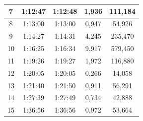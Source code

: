 \begin{table}[]
\begin{tabular}{|c|c|c|c|c|}
{\color[HTML]{000000} 7}                              & {\color[HTML]{000000} 1:12:47}                          & {\color[HTML]{000000} 1:12:48}                           & {\color[HTML]{000000} 1,936}            & {\color[HTML]{000000} 111,184}        \\ \hline
{\color[HTML]{000000} 8}                              & {\color[HTML]{000000} 1:13:00}                          & {\color[HTML]{000000} 1:13:00}                           & {\color[HTML]{000000} 0,947}            & {\color[HTML]{000000} 54,926}         \\ \hline
{\color[HTML]{000000} 9}                              & {\color[HTML]{000000} 1:14:27}                          & {\color[HTML]{000000} 1:14:31}                           & {\color[HTML]{000000} 4,245}            & {\color[HTML]{000000} 235,470}        \\ \hline
{\color[HTML]{000000} 10}                             & {\color[HTML]{000000} 1:16:25}                          & {\color[HTML]{000000} 1:16:34}                           & {\color[HTML]{000000} 9,917}            & {\color[HTML]{000000} 579,450}        \\ \hline
{\color[HTML]{000000} 11}                             & {\color[HTML]{000000} 1:19:26}                          & {\color[HTML]{000000} 1:19:27}                           & {\color[HTML]{000000} 1,972}            & {\color[HTML]{000000} 116,880}        \\ \hline
{\color[HTML]{000000} 12}                             & {\color[HTML]{000000} 1:20:05}                          & {\color[HTML]{000000} 1:20:05}                           & {\color[HTML]{000000} 0,266}            & {\color[HTML]{000000} 14,058}         \\ \hline
{\color[HTML]{000000} 13}                             & {\color[HTML]{000000} 1:21:40}                          & {\color[HTML]{000000} 1:21:50}                           & {\color[HTML]{000000} 0,911}            & {\color[HTML]{000000} 56,291}         \\ \hline
{\color[HTML]{000000} 14}                             & {\color[HTML]{000000} 1:27:39}                          & {\color[HTML]{000000} 1:27:49}                           & {\color[HTML]{000000} 0,734}            & {\color[HTML]{000000} 42,888}         \\ \hline
{\color[HTML]{000000} 15}                             & {\color[HTML]{000000} 1:36:56}                          & {\color[HTML]{000000} 1:36:56}                           & {\color[HTML]{000000} 0,972}            & {\color[HTML]{000000} 53,664}         \\ \hline

\end{tabular}
\end{table}
